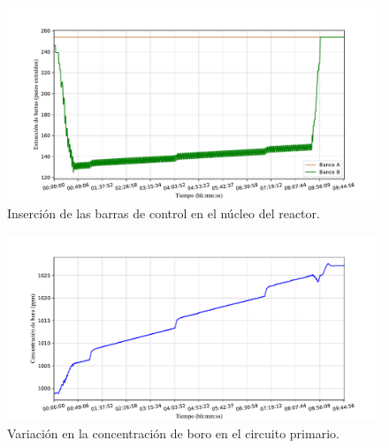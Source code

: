 \begin{figure}[!h]
  \centering
  \includegraphics[width=\textwidth]{content/figures/sim3_barras_control.pdf}
  \caption{Inserción de las barras de control en el núcleo del reactor.}
  \label{fig:sim3_barras_control}
\end{figure}

\begin{figure}[!h]
  \centering
  \includegraphics[width=\textwidth]{content/figures/sim3_boro.pdf}
  \caption{Variación en la concentración de boro en el circuito primario.}
  \label{fig:sim3_boro}
\end{figure}

